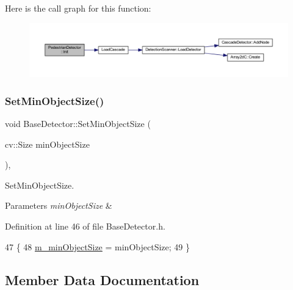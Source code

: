 Here is the call graph for this function\+:\nopagebreak
\begin{figure}[H]
\begin{center}
\leavevmode
\includegraphics[width=350pt]{class_pedestrian_detector_a630d8ad4d8ca2123639e989b01c8dd3e_cgraph}
\end{center}
\end{figure}
\mbox{\label{class_base_detector_ab459f4e77cf1110cc1ee84027f0f2a03}} 
\subsubsection{\texorpdfstring{Set\+Min\+Object\+Size()}{SetMinObjectSize()}}
{\footnotesize\ttfamily void Base\+Detector\+::\+Set\+Min\+Object\+Size (\begin{DoxyParamCaption}\item[{cv\+::\+Size}]{min\+Object\+Size }\end{DoxyParamCaption})\hspace{0.3cm}{\ttfamily [inline]}, {\ttfamily [inherited]}}



Set\+Min\+Object\+Size. 


\begin{DoxyParams}{Parameters}
{\em min\+Object\+Size} & \\
\hline
\end{DoxyParams}


Definition at line 46 of file Base\+Detector.\+h.


\begin{DoxyCode}
47     \{
48         \mbox{\hyperlink{class_base_detector_a651b938c89c94daac4763728637d90c9}{m\_minObjectSize}} = minObjectSize;
49     \}
\end{DoxyCode}


\subsection{Member Data Documentation}
\mbox{\label{class_pedestrian_detector_a600b0da8ac472bcd8cb8aeb0e9f87eb7}} 
